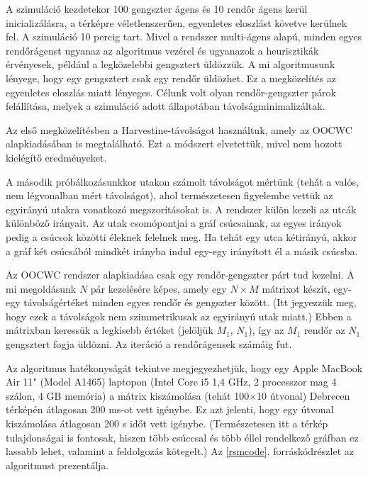 \documentclass[a4paper,12pt]{report}
\begin{document}
A szimuláció kezdetekor 100 gengszter ágens és 10 rendőr ágens kerül inicializálásra, a térképre véletlenszerűen, egyenletes eloszlást követve kerülnek fel. A szimuláció 10 percig tart. Mivel a rendszer multi-ágens alapú, minden egyes rendőrágenst ugyanaz az algoritmus vezérel és ugyanazok a heurisztikák érvényesek, például a legközelebbi gengsztert üldözzük. A mi algoritmusunk lényege, hogy egy gengsztert csak egy rendőr üldözhet. Ez a megközelítés az egyenletes eloszlás miatt lényeges. Célunk volt olyan rendőr-gengszter párok felállítása, melyek a szimuláció adott állapotában távolságminimalizáltak.

Az első megközelítésben a Harvestine-távolságot használtuk, amely az OOCWC alapkiadásában is megtalálható. Ezt a módszert elvetettük, mivel nem hozott kielégítő eredményeket.

A második próbálkozásunkkor utakon számolt távolságot mértünk (tehát a valós, nem légvonalban mért távolságot), ahol természetesen figyelembe vettük az egyirányú utakra vonatkozó megszorításokat is. A rendszer külön kezeli az utcák különböző irányait. Az utak csomópontjai a gráf csúcsainak, az egyes irányok pedig a csúcsok közötti éleknek felelnek meg. Ha tehát egy utca kétirányú, akkor a gráf két csúcsából mindkét irányba indul egy-egy irányított él a másik csúcsba. 

Az OOCWC rendszer alapkiadása csak egy rendőr-gengszter párt tud kezelni. A mi megoldásunk $N$ pár kezelésére képes, amely egy $N{\times}M$ mátrixot készít, egy-egy távolságértéket minden egyes rendőr és gengszter között. (Itt jegyezzük meg, hogy ezek a távolságok nem szimmetrikusak az egyirányú utak miatt.) Ebben a mátrixban keressük a legkisebb értéket (jelöljük $M_1$, $N_1$), így az $M_1$ rendőr az $N_1$ gengsztert fogja üldözni. Az iteráció a rendőrágensek számáig fut.

Az algoritmus hatékonyságát tekintve megjegyezhetjük, hogy egy Apple MacBook Air 11" (Model A1465) laptopon (Intel Core i5 1,4 GHz, 2 processzor mag 4 szálon, 4 GB memória) a mátrix kiszámolása (tehát 100$\times$10 útvonal) Debrecen térképén átlagosan 200 ms-ot vett igénybe. Ez azt jelenti, hogy egy útvonal kiszámolása átlagosan 200 \si{\micro}s időt vett igénybe. (Természetesen itt a térkép tulajdonságai is fontosak, hiszen több csúccsal és több éllel rendelkező gráfban ez lassabb lehet, valamint a feldolgozás kötegelt.) Az \ref{rsmcode}. forráskódrészlet az algoritmust prezentálja.

\newpage

\end{document}
